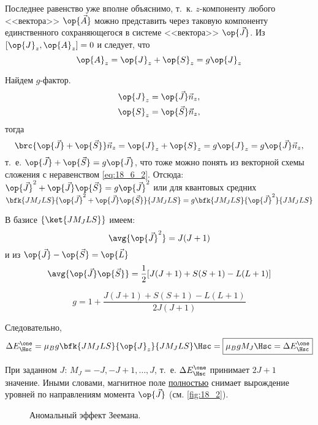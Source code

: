 Последнее равенство уже вполне объяснимо, т.~к. $z$-компоненту любого <<вектора>> $\op{\vec{A}}$ можно представить через таковую компоненту единственного сохраняющегося в системе <<вектора>> $\op{\vec{J}}$. Из $[\op{J}_z, \op{A}_z] = 0$ и следует, что 
$$
\op{A}_z = \op{J}_z + \op{S}_z = g\op{J}_z
$$

Найдем $g$-фактор.
\begin{gather*}
\op{J}_z = \op{\vec{J}} \vec{n}_z, \\
\op{S}_z = \op{\vec{S}} \vec{n}_z,
\end{gather*}
тогда
$$
\brc{\op{\vec{J}} + \op{\vec{S}}}\vec{n}_z = \op{J}_z + \op{S}_z = g \op{J}_z = g \op{\vec{J}} \vec{n}_z,
$$
т.~е. $\op{\vec{J}} + \op{\vec{S}} = g\op{\vec{J}}$, что тоже можно понять из векторной схемы сложения с неравенством \eqref{eq:18_6_2}. Отсюда: 
$\op{\vec{J}}^2 + \op{\vec{J}} \op{\vec{S}} = g \op{\vec{J}}^2$ или для квантовых средних $\bfk{J M_J L S}{\op{\vec{J}}^2 + \op{\vec{J}} \op{\vec{S}}}{J M_J L S} = g \bfk{J M_J L S}{\op{\vec{J}}^2}{J M_J L S}$

В базисе $\{ \ket{J M_J L S}\}$ имеем: \newline
$$\avg{\op{\vec{J}}^2} = J(J+1)$$
и из $\op{\vec{J}} - \op{\vec{S}} = \op{\vec{L}}$
$$
\avg{\op{\vec{J}} \op{\vec{S}}} = \frac{1}{2}[J(J+1) + S(S+1) - L(L + 1)]
$$

\begin{equation}
\label{eq:18_6_3}
\boxed{g = 1 + \frac{J(J+1) + S(S + 1) - L(L + 1)}{2J(J+1)}}
\end{equation}

Следовательно,
\begin{equation}
\label{eq:18_6_4}
\Delta E_{\Hsc}^\one = \mu_B g \bfk{J M_J L S}{\op{J}_z}{J M_J L S} \Hsc = \boxed{\mu_B g M_J \Hsc = \Delta E_{\Hsc}^\one}
\end{equation}

При заданном $J$: $M_J = -J, -J + 1, \dots, J$, т.~е. $\Delta E_{\Hsc}^\one$ принимает $2J+1$ значение. Иными словами, магнитное поле \underline{полностью} снимает вырождение уровней по направлениям момента $\op{\vec{J}}$ (см. \autoref{fig:18_2}).
\begin{figure}[h!]
\centering
{}
\caption{Аномальный эффект Зеемана.} \label{fig:18_2}
\end{figure}

